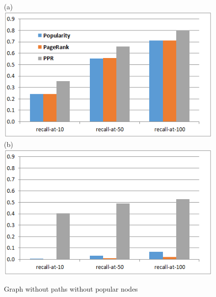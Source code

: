 \documentclass[11pt,oneside]{book}
\begin{document}
\begin{figure}[h]
\centering
	\centering
	(a) \\
\includegraphics[scale=0.8]{figures/pop-final.png} \\
	\centering
(b) \\
\includegraphics[scale=0.8]{figures/sans-popular-final.png}
	\caption{Graph without paths without popular nodes}
	\label{fig:minlen2remove500}
\end{figure}
\end{document}
